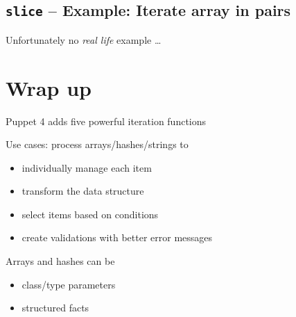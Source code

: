 \documentclass[english,aspectratio=43,nohandout]{beamer}
\begin{document}
\subsection{\texttt{slice} -- Example: Iterate array in pairs}

\begin{frame}{\insertsection}{\insertsubsection}
\pause


\vspace{\baselineskip}\pause

Unfortunately no \textit{real life}\texttrademark{} example \dots
\end{frame}

\section{Wrap up}

\begin{frame}{\insertsection}{\insertsubsection}

Puppet 4 adds five powerful iteration functions

\vspace{\baselineskip}\pause

Use cases: process arrays/hashes/strings to
\begin{itemize}
\item individually manage each item\pause
\item transform the data structure\pause
\item select items based on conditions\pause
\item create validations with better error messages
\end{itemize}

\vspace{\baselineskip}\pause

Arrays and hashes can be
\begin{itemize}
\item class/type parameters
\item structured facts
\end{itemize}
\end{frame}

\end{document}
